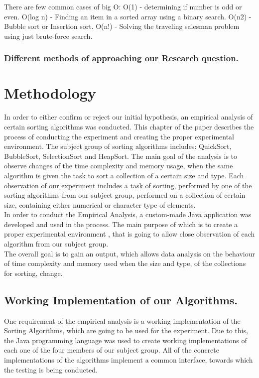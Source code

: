 \documentclass[]{report}
\begin{document}
		There are few common cases of big O:
		O(1) - determining if number is odd or even.
		O(log n) - Finding an item in a sorted array using a binary search.
		O(n2) - Bubble sort or Insertion sort.
		O(n!) - Solving the traveling salesman problem using just brute-force search.
		\subsubsection{Different methods of approaching our Research question.}
		\clearpage
\section{Methodology}
In order to either confirm or reject our initial hypothesis, an empirical analysis of certain sorting algorithms was conducted. This chapter of the paper describes the process of conducting the experiment and creating the proper experimental environment. The subject group of sorting algorithms includes: QuickSort, BubbleSort, SelectionSort and HeapSort. The main goal of the analysis is to observe changes of the time complexity and memory usage, when the same algorithm is given the task to sort a collection of a certain size and type.
 Each observation of our experiment includes a task of sorting, performed by one of the sorting algorithms from our subject group, performed on a collection of certain size, containing either numerical or character type of elements.\\
In order to conduct the Empirical Analysis, a custom-made Java application was developed and used in the process. The main purpose  of which is to create a proper experimental environment , that is going to allow close observation of each algorithm from our subject group. \\
The overall goal is to gain an output, which allows data analysis on the behaviour of time complexity and memory used when the size and type, of the collections for sorting, change. 
	\subsection{Working Implementation of our Algorithms.}
	One requirement of the empirical analysis is a working implementation of the Sorting Algorithms, which are going to be used for the experiment. Due to this, the Java programming language was used to create working implementations of each one of the four members of our subject group. All of the concrete implementations of the algorithms implement a common interface, towards which the testing is being conducted.
\end{document}
